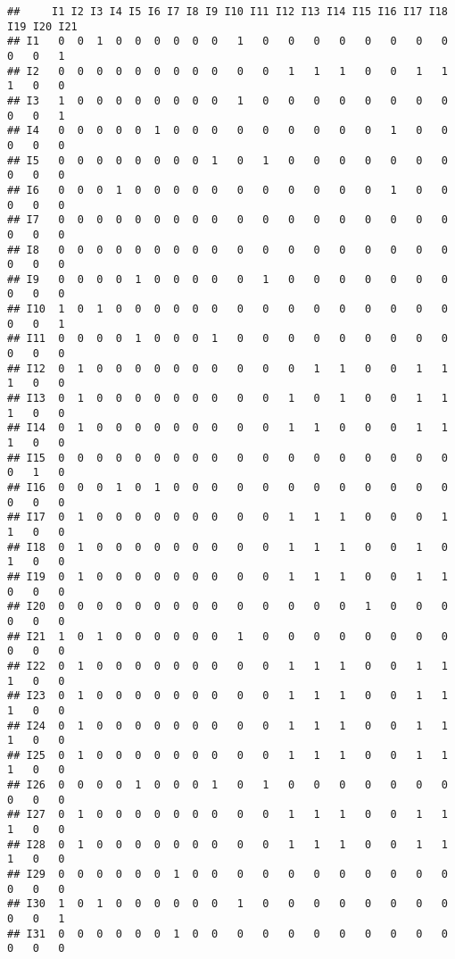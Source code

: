 \documentclass[
]{article}
\begin{document}
\begin{verbatim}
##     I1 I2 I3 I4 I5 I6 I7 I8 I9 I10 I11 I12 I13 I14 I15 I16 I17 I18 I19 I20 I21
## I1   0  0  1  0  0  0  0  0  0   1   0   0   0   0   0   0   0   0   0   0   1
## I2   0  0  0  0  0  0  0  0  0   0   0   1   1   1   0   0   1   1   1   0   0
## I3   1  0  0  0  0  0  0  0  0   1   0   0   0   0   0   0   0   0   0   0   1
## I4   0  0  0  0  0  1  0  0  0   0   0   0   0   0   0   1   0   0   0   0   0
## I5   0  0  0  0  0  0  0  0  1   0   1   0   0   0   0   0   0   0   0   0   0
## I6   0  0  0  1  0  0  0  0  0   0   0   0   0   0   0   1   0   0   0   0   0
## I7   0  0  0  0  0  0  0  0  0   0   0   0   0   0   0   0   0   0   0   0   0
## I8   0  0  0  0  0  0  0  0  0   0   0   0   0   0   0   0   0   0   0   0   0
## I9   0  0  0  0  1  0  0  0  0   0   1   0   0   0   0   0   0   0   0   0   0
## I10  1  0  1  0  0  0  0  0  0   0   0   0   0   0   0   0   0   0   0   0   1
## I11  0  0  0  0  1  0  0  0  1   0   0   0   0   0   0   0   0   0   0   0   0
## I12  0  1  0  0  0  0  0  0  0   0   0   0   1   1   0   0   1   1   1   0   0
## I13  0  1  0  0  0  0  0  0  0   0   0   1   0   1   0   0   1   1   1   0   0
## I14  0  1  0  0  0  0  0  0  0   0   0   1   1   0   0   0   1   1   1   0   0
## I15  0  0  0  0  0  0  0  0  0   0   0   0   0   0   0   0   0   0   0   1   0
## I16  0  0  0  1  0  1  0  0  0   0   0   0   0   0   0   0   0   0   0   0   0
## I17  0  1  0  0  0  0  0  0  0   0   0   1   1   1   0   0   0   1   1   0   0
## I18  0  1  0  0  0  0  0  0  0   0   0   1   1   1   0   0   1   0   1   0   0
## I19  0  1  0  0  0  0  0  0  0   0   0   1   1   1   0   0   1   1   0   0   0
## I20  0  0  0  0  0  0  0  0  0   0   0   0   0   0   1   0   0   0   0   0   0
## I21  1  0  1  0  0  0  0  0  0   1   0   0   0   0   0   0   0   0   0   0   0
## I22  0  1  0  0  0  0  0  0  0   0   0   1   1   1   0   0   1   1   1   0   0
## I23  0  1  0  0  0  0  0  0  0   0   0   1   1   1   0   0   1   1   1   0   0
## I24  0  1  0  0  0  0  0  0  0   0   0   1   1   1   0   0   1   1   1   0   0
## I25  0  1  0  0  0  0  0  0  0   0   0   1   1   1   0   0   1   1   1   0   0
## I26  0  0  0  0  1  0  0  0  1   0   1   0   0   0   0   0   0   0   0   0   0
## I27  0  1  0  0  0  0  0  0  0   0   0   1   1   1   0   0   1   1   1   0   0
## I28  0  1  0  0  0  0  0  0  0   0   0   1   1   1   0   0   1   1   1   0   0
## I29  0  0  0  0  0  0  1  0  0   0   0   0   0   0   0   0   0   0   0   0   0
## I30  1  0  1  0  0  0  0  0  0   1   0   0   0   0   0   0   0   0   0   0   1
## I31  0  0  0  0  0  0  1  0  0   0   0   0   0   0   0   0   0   0   0   0   0

\end{verbatim}
\end{document}
